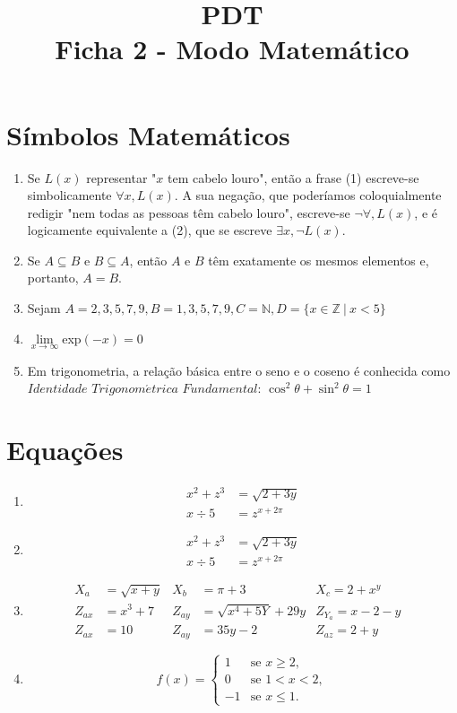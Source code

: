 \documentclass[12pt, a4paper]{article}
\date{}
\title{PDT \\Ficha 2 - Modo Matemático}
\begin{document}
\maketitle
\section{Símbolos Matemáticos}
\begin{enumerate} [label= (\alph*)]
\item Se $L(x)$ representar "$x$ tem cabelo louro", ent\~ao a frase (1) escreve-se  simbolicamente $\forall x, L(x).$ A sua negação, que poderíamos coloquialmente redigir "nem todas as pessoas t\^em cabelo louro", escreve-se $\neg \forall, L(x)$, e é logicamente equivalente a (2), que se escreve $\exists x, \neg L(x).$
\item Se $A \subseteq B $ e $B \subseteq A$, então $A$ e $B$ t\^em exatamente os mesmos elementos e, portanto, $A = B$.
\item Sejam $A = 2, 3, 5, 7, 9, B = 1, 3, 5, 7, 9, C = \mathbb{N} , D = \{x \in \mathbb{Z}\ |\ x < 5\}$
\item $\lim\limits_{x\to\infty} $exp$(-x) = 0$ 
\item Em trigonometria, a relaç\~ao básica entre o seno e o coseno é conhecida como $Identidade$ $Trigonom \acute{e}trica$ $Fundamental$: ${\cos}^2\theta + {\sin}^2\theta = 1$
\end{enumerate}

\section{Equaç\~oes}
\begin{enumerate} [label= (\alph*)]
\item
\begin{equation}
\begin{split}
 x^2 + z^3& = \sqrt{2+3y} \\
 x\div 5& = z^{x+2\pi}
\end{split}
\end{equation}
\item
\begin{align}
x^2 + z^3& = \sqrt{2+3y}\\
x\div 5& = z^{x+2\pi}
\end{align}
\item\begin{align}
X_a& = \sqrt{x+y}&
  X_b& = \pi + 3&
    X_c = 2 + x^y&\\
Z_{ax}& = x^3 + 7&
  Z_{ay}& = \sqrt{x^4+5Y}+ 29y&
    Z_{Y_{a}} = x - 2 - y&\\
Z_{ax}& = 10&
  Z_{ay}& = 35y - 2&
    Z_{az} = 2 + y& 
\end{align}
\item
\begin{equation}
f(x) =
 \begin{cases}
  1 &\text{se } x \geq 2,\\
   0  &\text{se } 1<x<2,\\
    -1 &\text{se } x \leq 1.
 \end{cases}
\end{equation}
\end{enumerate}
\end{document}
